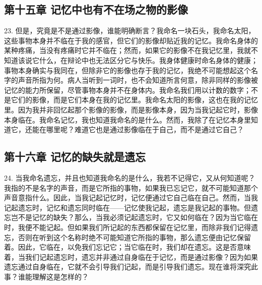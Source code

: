 
\subsection{第十五章 记忆中也有不在场之物的影像}

23. 但是，究竟是不是通过影像，谁能明确断言？我命名一块石头，我命名太阳，这些事物本身并不临在于我的感官，但它们的影像却贴近我的记忆。我命名身体的某种疼痛，当没有疼痛时它并不临在；然而，如果它的影像不在我记忆里，我就不知道该说它什么，在辩论中也无法区分它与快乐。我身体健康时命名身体的健康；事物本身确实与我同在，但除非它的影像也存于我的记忆，我绝不可能想起这个名字的声音所指为何。病人当听到一词时，也不会知道所言何意，除非同样的影像被记忆的能力所保留，尽管事物本身并不在身体内。我命名我们用以计数的数字；不是它们的影像，而是它们本身在我的记忆里。我命名太阳的影像，这也在我的记忆里。因为我并非回忆起那个影像的影像，而是影像本身，因为当我记起它时，影像本身临在。我命名记忆，我也知道我命名的是什么。然而，我除了在记忆本身里知道它，还能在哪里呢？难道它也是通过影像临在于自己，而不是通过它自己？\par


\subsection{第十六章 记忆的缺失就是遗忘}

24. 当我命名遗忘，并且也知道我命名的是什么，我若不记得它，又从何知道呢？我指的不是名字的声音，而是它所指的事物，如果我已忘记它，就不可能知道那个声音意指什么。因此，当我记起记忆时，记忆便通过它自己临在自己。然而，当我记起遗忘时，记忆和遗忘同时临在——记忆使我记起，遗忘是我记起的事物。但遗忘岂不是记忆的缺失？那么，当我必须记起遗忘时，它又如何临在？因为当它临在时，我便不能记起。但如果我们所记起的东西都保留在记忆里，而除非我们记得遗忘，否则在听到这个名称时绝不可能知道它所指的事物，那么遗忘便由记忆保留着。因此，它临在，以免我们忘记它；当它临在时，我们却在遗忘。这是否意味着，当我们记起遗忘时，遗忘并非通过自身临在于记忆，而是通过影像？因为如果遗忘通过自身临在，它就不会引导我们记起，而是引导我们遗忘。现在谁将深究此事？谁能理解这是怎样的？\par


